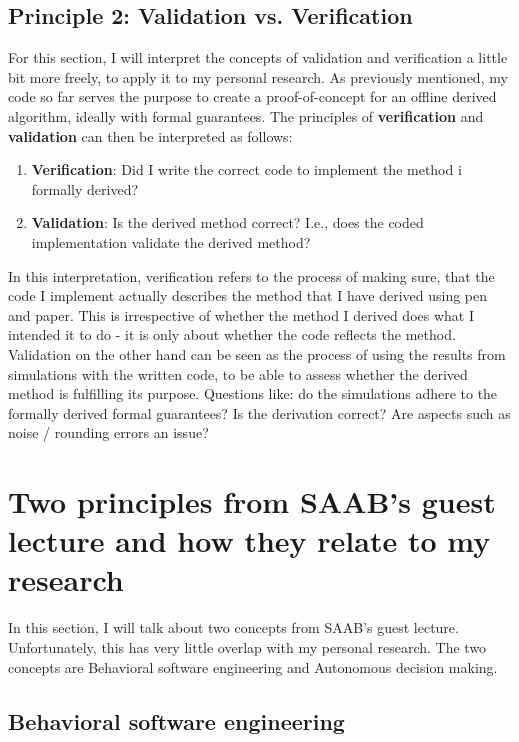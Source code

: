 \documentclass[11pt]{article}
\begin{document}
\subsection{Principle 2: Validation vs. Verification}

For this section, I will interpret the concepts of validation and verification a little bit more freely, to apply it to my personal research. 
As previously mentioned, my code so far serves the purpose to create a proof-of-concept for an offline derived algorithm, ideally with formal guarantees. 
The principles of \textbf{verification} and \textbf{validation} can then be interpreted as follows:

\begin{enumerate}
    \item \textbf{Verification}: Did I write the correct code to implement the method i formally derived? 
    \item \textbf{Validation}: Is the derived method correct? I.e., does the coded implementation validate the derived method?
\end{enumerate}

In this interpretation, verification refers to the process of making sure, that the code I implement actually describes the method that I have derived using pen and paper. This is irrespective of whether the method I derived does what I intended it to do - it is only about whether the code reflects the method. 
Validation on the other hand can be seen as the process of using the results from simulations with the written code, to be able to assess whether the derived method is fulfilling its purpose. Questions like: do the simulations adhere to the formally derived formal guarantees? Is the derivation correct? Are aspects such as noise / rounding errors an issue? 

\section{Two principles from SAAB's guest lecture and how they relate to my research}

In this section, I will talk about two concepts from SAAB's guest lecture. Unfortunately, this has very little overlap with my personal research. 
The two concepts are Behavioral software engineering and Autonomous decision making.

\subsection{Behavioral software engineering}
\end{document}
